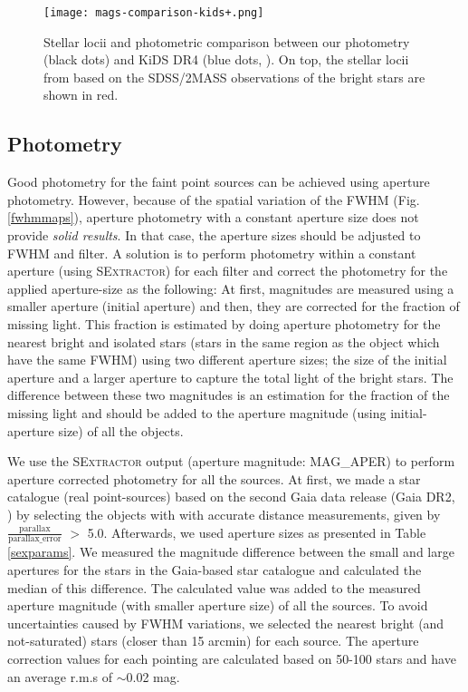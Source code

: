 \documentclass[fleqn,usenatbib]{mnras}
\begin{document}
\begin{figure*}
\centering
        \texttt{[image: mags-comparison-kids+.png]}
\caption{Stellar locii and photometric comparison between our photometry (black dots) and KiDS DR4 (blue dots, \citealp{kids-dr4}). On top, the stellar locii from \citet{covey} based on the SDSS/2MASS observations of the bright stars are shown in red.}
\label{fdsvskids}
\end{figure*}

\subsection{Photometry}

Good photometry for the faint point sources can be achieved using aperture photometry. However, because of the spatial variation of the FWHM (Fig. \ref{fwhmmaps}), aperture photometry with a constant aperture size does not provide \textit{solid results}. In that case, the aperture sizes should be adjusted to FWHM and filter. A solution is to perform photometry within a constant aperture (using \textsc{SExtractor}) for each filter and correct the photometry for the applied aperture-size as the following: At first, magnitudes are measured using a smaller aperture (initial aperture) and then, they are corrected for the fraction of missing light. This fraction is estimated by doing aperture photometry for the nearest bright and isolated stars (stars in the same region as the object which have the same FWHM) using two different aperture sizes; the size of the initial aperture and a larger aperture to capture the total light of the bright stars. The difference between these two magnitudes is an estimation for the fraction of the missing light and should be added to the aperture magnitude (using initial-aperture size) of all the objects.

We use the \textsc{SExtractor} output (aperture magnitude: MAG\_APER) to perform aperture corrected photometry for all the sources. At first, we made a star catalogue (real point-sources) based on the second Gaia data release (Gaia DR2, \citealp{gaia}) by selecting the objects with with accurate distance measurements, given by $ \frac{\text{parallax}}{\text{parallax$\_$error}} $ $>$ 5.0. Afterwards, we used aperture sizes as presented in Table \ref{sexparams}. We measured the magnitude difference between the small and large apertures for the stars in the Gaia-based star catalogue and calculated the median of this difference. The calculated value was added to the measured aperture magnitude (with smaller aperture size) of all the sources. To avoid uncertainties caused by FWHM variations, we selected the nearest bright (and not-saturated) stars (closer than 15 arcmin) for each source. The aperture correction values for each pointing are calculated based on 50-100 stars and have an average r.m.s of $\sim$0.02 mag.
\end{document}
